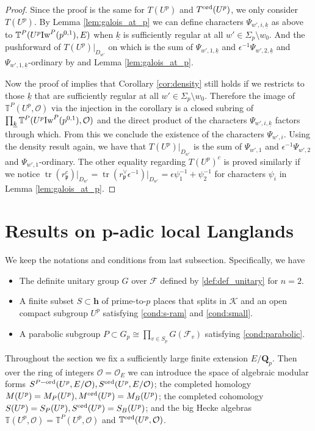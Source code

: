 \documentclass[leqno]{amsart}
\theoremstyle{definition}
\theoremstyle{remark}
\newcommand{\oo}{\mathcal{O}}
\newcommand{\Qp}{\mathbf{Q}_p}
\newcommand{\finite}{\mathbf{h}}
\DeclareMathOperator{\mtr}{tr}
\newcommand{\fp}{\mathfrak{p}}
\newcommand{\F}{{\mathcal{F}}} %
\newcommand{\K}{{\mathcal{K}}} %
\newcommand{\wt}[1]{\underline{ #1 }}
\newcommand{\Iw}{\textnormal{Iw}} %
\newcommand{\TT}{\mathbb{T}} %
\newcommand{\ord}{\textnormal{ord}} %
\begin{document}
\begin{proof}

Since the proof is the same for $T(U^p)$ and $T^{\ord}(U^p)$,
we only consider $T(U^p)$.
By Lemma \ref{lem:galois_at_p}
we can define characters $\Psi_{w',i,\wt{k}}$ as above
to $\TT^P(U^p\Iw^P(p^{0,1}),E)$
when $\wt{k}$ is sufficiently regular
at all $w'\in \Sigma_p\setminus{w_0}$.
And the pushforward of $T(U^p)\vert_{D_{w'}}$ on which
is the sum of $\Psi_{w',1,\wt{k}}$ and
$\epsilon^{-1}\Psi_{w',2,\wt{k}}$
and $\Psi_{w',1,\wt{k}}$-ordinary 
by \cite[Lem 5.3.3]{pan} and Lemma \ref{lem:galois_at_p}.

Now the proof of \cite[Cor 3.4]{ger}
implies that Corollary \ref{cor:density} still holds
if we restricts to those $\wt{k}$
that are sufficiently regular
at all $w'\in \Sigma_p\setminus{w_0}$.
Therefore the image of $\TT^P(U^p,\oo)$
via the injection in the corollary
is a closed subring of $\prod_{\wt{k}}\TT^P(U^p\Iw^P(p^{0,1}),\oo)$
and the direct product of the characters
$\Psi_{w',i,\wt{k}}$ factors through which.
From this we conclude the existence 
of the characters $\Psi_{w',i}$.
Using the density result again,
we have that $T(U^p)\vert_{D_{w'}}$
is the sum of $\Psi_{w',1}$ and $\epsilon^{-1}\Psi_{w',2}$
and $\Psi_{w',1}$-ordinary.
The other equality regarding $T(U^p)^c$ is proved similarly
if we notice
$\mtr(r_\fp^c)\vert_{D_{w'}}=
\mtr(r_\fp^\vee\epsilon^{-1})\vert_{D_{w'}}=
\epsilon\psi_1^{-1}+\psi_2^{-1}$
for characters $\psi_i$ in Lemma \ref{lem:galois_at_p}.




\end{proof}

\section{Results on p-adic local Langlands}

We keep the notations and conditions from last subsection.
Specifically, we have
\begin{itemize}
\item The definite unitary group $G$ over $\F$
defined by \eqref{def:def_unitary} for $n=2$.
\item A finite subset $S\subset\finite$ of prime-to-$p$
places that splits in $\K$
and an open compact subgroup $U^p$
satisfying \eqref{cond:s-ram} and \eqref{cond:small}.
\item A parabolic subgroup $P\subset G_p\cong\prod_{v\in S_p}G(\F_v)$
satisfying \eqref{cond:parabolic}.
\end{itemize}
Throughout the section
we fix a sufficiently large finite extension $E/\Qp$.
Then over the ring of integers $\oo=\oo_E$ 
we can introduce the space of 
algebraic modular forms 
$S^{P-\ord}(U^p,E/\oo), S^{\ord}(U^p,E/\oo)$;
the completed homology
$M(U^p)=M_P(U^p), M^{\ord}(U^p)=M_B(U^p)$; 
the completed cohomology
$S(U^p)=S_P(U^p), S^{\ord}(U^p)=S_B(U^p)$;
and the big Hecke algebras
$\TT(U^p,\oo)=\TT^P(U^p,\oo)$ and $\TT^{\ord}(U^p,\oo)$.
\end{document}
